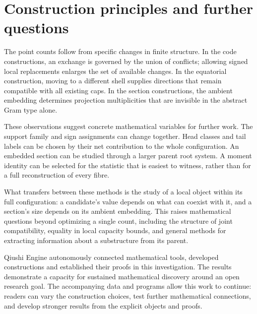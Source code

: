 \section{Construction principles and further questions}

The point counts follow from specific changes in finite structure. In the
code constructions, an exchange is governed by the union of conflicts;
allowing signed local replacements enlarges the set of available changes.
In the equatorial construction, moving to a different shell supplies directions
that remain compatible with all existing caps. In the section constructions,
the ambient embedding determines projection multiplicities that are invisible
in the abstract Gram type alone.

These observations suggest concrete mathematical variables for further work.
The support family and sign assignments can change together. Head classes and
tail labels can be chosen by their net contribution to the whole configuration.
An embedded section can be studied through a larger parent root system.
A moment identity can be selected for the statistic that is easiest to witness,
rather than for a full reconstruction of every fibre.

What transfers between these methods is the study of a local object within
its full configuration: a candidate's value depends on what can coexist
with it, and a section's size depends on its ambient embedding. This raises
mathematical questions beyond optimizing a single count, including the
structure of joint compatibility, equality in local capacity bounds, and
general methods for extracting information about a substructure from its
parent.

Qiushi Engine autonomously connected mathematical tools, developed
constructions and established their proofs in this investigation. The
results demonstrate a capacity for sustained mathematical discovery around
an open research goal. The accompanying data and programs allow this work
to continue: readers can vary the construction choices, test further
mathematical connections, and develop stronger results from the explicit
objects and proofs.
